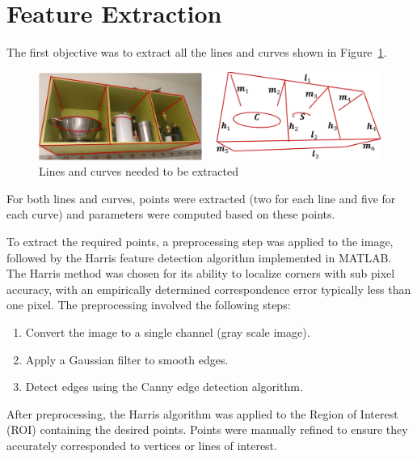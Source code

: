 \documentclass{Academic}
\begin{document}
\myabstract{}
\renewcommand{\myTitle}{Image Analysis And Computer Vision}
\renewcommand{\MyAuthor}{Christian Rossi}
\maketitle
\onehalfspacing

\section{Feature Extraction}
The first objective was to extract all the lines and curves shown in Figure~\ref{fig:lines}.
\begin{figure}[!htb]
    \centering
    \includegraphics[width=\textwidth]{images/lines.png}
    \caption{Lines and curves needed to be extracted}
    \label{fig:lines}
\end{figure}

\noindent For both lines and curves, points were extracted (two for each line and five for each curve) and parameters were computed based on these points.

To extract the required points, a preprocessing step was applied to the image, followed by the Harris feature detection algorithm implemented in MATLAB. 
The Harris method was chosen for its ability to localize corners with sub pixel accuracy, with an empirically determined correspondence error typically less than one pixel. 
The preprocessing involved the following steps:
\begin{enumerate}
    \item Convert the image to a single channel (gray scale image).
    \item Apply a Gaussian filter to smooth edges.
    \item Detect edges using the Canny edge detection algorithm.
\end{enumerate}

After preprocessing, the Harris algorithm was applied to the Region of Interest (ROI) containing the desired points. 
Points were manually refined to ensure they accurately corresponded to vertices or lines of interest.
\end{document}
